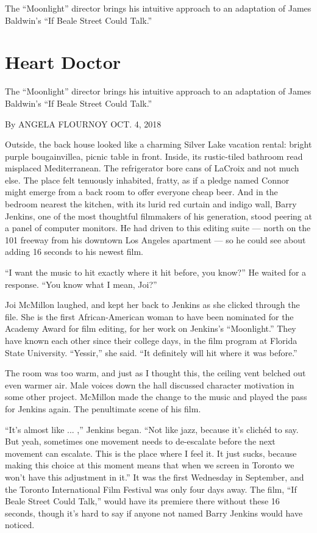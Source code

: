 The ``Moonlight'' director brings his intuitive approach to an
adaptation of James Baldwin's ``If Beale Street Could Talk.''

\hypertarget{heart-doctor}{%
\section{Heart Doctor}\label{heart-doctor}}

The ``Moonlight'' director brings his intuitive approach to an
adaptation of James Baldwin's ``If Beale Street Could Talk.''

By ANGELA FLOURNOY OCT. 4, 2018

Outside, the back house looked like a charming Silver Lake vacation
rental: bright purple bougainvillea, picnic table in front. Inside, its
rustic-tiled bathroom read misplaced Mediterranean. The refrigerator
bore cans of LaCroix and not much else. The place felt tenuously
inhabited, fratty, as if a pledge named Connor might emerge from a back
room to offer everyone cheap beer. And in the bedroom nearest the
kitchen, with its lurid red curtain and indigo wall, Barry Jenkins, one
of the most thoughtful filmmakers of his generation, stood peering at a
panel of computer monitors. He had driven to this editing suite ---
north on the 101 freeway from his downtown Los Angeles apartment --- so
he could see about adding 16 seconds to his newest film.

``I want the music to hit exactly where it hit before, you know?'' He
waited for a response. ``You know what I mean, Joi?''

Joi McMillon laughed, and kept her back to Jenkins as she clicked
through the file. She is the first African-American woman to have been
nominated for the Academy Award for film editing, for her work on
Jenkins's ``Moonlight.'' They have known each other since their college
days, in the film program at Florida State University. ``Yessir,'' she
said. ``It definitely will hit where it was before.''

The room was too warm, and just as I thought this, the ceiling vent
belched out even warmer air. Male voices down the hall discussed
character motivation in some other project. McMillon made the change to
the music and played the pass for Jenkins again. The penultimate scene
of his film.

``It's almost like ... ,'' Jenkins began. ``Not like jazz, because it's
clichéd to say. But yeah, sometimes one movement needs to de-escalate
before the next movement can escalate. This is the place where I feel
it. It just sucks, because making this choice at this moment means that
when we screen in Toronto we won't have this adjustment in it.'' It was
the first Wednesday in September, and the Toronto International Film
Festival was only four days away. The film, ``If Beale Street Could
Talk,'' would have its premiere there without these 16 seconds, though
it's hard to say if anyone not named Barry Jenkins would have noticed.

